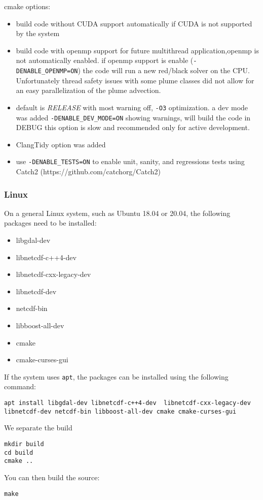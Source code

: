 cmake options:
\begin{itemize}
    \item build code without CUDA support automatically if CUDA is not supported by the system
	\item build code with openmp support for future multithread application,openmp is not automatically enabled. if openmp support is enable (\verb|-DENABLE_OPENMP=ON|) the code will run a new red/black solver on the CPU. Unfortunately thread safety issues with some plume classes did not allow for an easy parallelization of the plume advection.
	\item default is \textit{RELEASE} with most warning off, \verb|-O3| optimization.
a dev mode was added \verb|-DENABLE_DEV_MODE=ON| showing warnings, will build the code in DEBUG this option is slow and recommended only for active development.
	\item ClangTidy option was added
	\item use \verb|-DENABLE_TESTS=ON| to enable unit, sanity, and regressions tests using Catch2 (https://github.com/catchorg/Catch2) 
\end{itemize}



\subsubsection{Linux}
On a general Linux system, such as Ubuntu 18.04 or 20.04, the following packages need to be installed:
\begin{itemize}
\item libgdal-dev
\item libnetcdf-c++4-dev
\item libnetcdf-cxx-legacy-dev
\item libnetcdf-dev
\item netcdf-bin
\item libboost-all-dev
\item cmake
\item cmake-curses-gui
\end{itemize}

If the system uses \verb|apt|, the packages can be installed using the following command:
\begin{verbatim}
apt install libgdal-dev libnetcdf-c++4-dev  libnetcdf-cxx-legacy-dev libnetcdf-dev netcdf-bin libboost-all-dev cmake cmake-curses-gui
\end{verbatim}


We separate the build 
\begin{verbatim}
mkdir build
cd build
cmake ..
\end{verbatim}
You can then build the source:
\begin{verbatim}
make
\end{verbatim}

